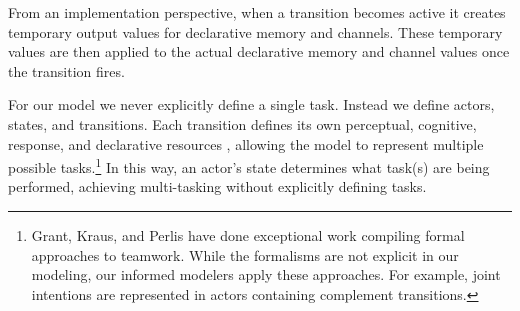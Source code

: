 From an implementation perspective, when a transition becomes active it creates temporary
output values for declarative memory and channels.  These temporary values are
then applied to the actual declarative memory and channel values once the transition fires.

For our model we never explicitly define a single task.  Instead
we define actors, states, and transitions.  Each transition defines its own
perceptual, cognitive, response, and declarative resources \cite{salvucci2008threaded}, allowing the model to represent multiple possible tasks.\footnote{Grant, Kraus, and Perlis have done exceptional work compiling formal approaches
to teamwork. While the formalisms are not explicit in our modeling, our informed
modelers apply these approaches. For example, joint intentions are represented
in actors containing complement transitions.}  In this way, an actor's state
determines what task(s) are being performed, achieving multi-tasking without
explicitly defining tasks. 



